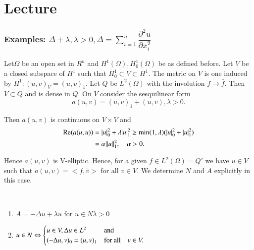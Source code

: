 
\chapter{Lecture}\label{lec6} %

\setcounter{section}{3}
\subsection{Examples: \texorpdfstring{$\Delta + \lambda, \lambda >0, \Delta = \sum\limits_{i=1}^n
  \dfrac{\partial^2 u}{\partial x_i^2}$}{Delta}}\label{lec6:sec3:subsec3}

Let\pageoriginale $\Omega$ be an open set in $R^n$ and $H^1(\Omega), H^1_0 (\Omega)$
be as defined before. Let $V$ be a closed subspace of $H^1$ such that
$H^1_0 \subset V \subset H^1$. The metric on $V$ is one induced by
$H^1 : (u, v)_V = (u, v)_1$. Let $Q$ be $L^2 (\Omega)$ with the
involution $f \rightarrow \bar{f}$. Then $V \subset Q$ and is dense in
$Q$. On $V$ consider the sesquilinear form 
$$
a(u, v) = (u, v)_1 + (u, v), \lambda > 0.
$$

Then $a(u, v)$ is continuous on $V \times V$ and 
\begin{align*}
\operatorname{Re}  (a(u, u)) & = |u|^2_0 + \lambda |u|^2_1 \ge \min (1, \lambda)
(|u|^2_0+ |u|^2_1)\\ 
& = \alpha \|u\|^2_1 , \quad \alpha > 0.
\end{align*}

Hence $a(u, v)$ is V-elliptic. Hence, for a given $f \in
L^2(\Omega) = Q'$ we have $u \in V$ such that $a(u, v) = <f,
\bar{v}>$ for all $v \in V$. We determine $N$ and $A$
explicitly in this case. 

\begin{proposition}\label{lec6:sec3:subsec3:prop3.1}%
~
\begin{enumerate}[\rm 1)]
\item $A = - \Delta u + \lambda u$ {\rm for} $u \in N \lambda > 0$
\item $u \in N \Leftrightarrow 
  {\begin{cases}  
           u \in
           V, \Delta u \in L^2 & {\rm and}\\ 
    (- \Delta u, v)_0 = (u, v)_1 & {\rm for ~all } \quad v \in
    V. \end{cases} } $  
\end{enumerate}
\end{proposition}

